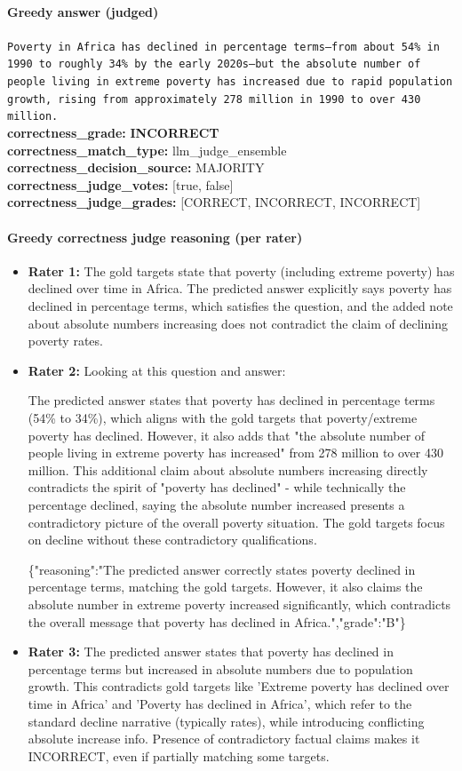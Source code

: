 \documentclass[11pt]{article}
\newcommand{\gradebad}[1]{\textcolor{red!70!black}{\textbf{#1}}}
\newcommand{\mono}[1]{\texttt{#1}}
\begin{document}
\paragraph{Greedy answer (judged)}
\mono{Poverty in Africa has declined in percentage terms—from about 54\% in 1990 to roughly 34\% by the early 2020s—but the absolute number of people living in extreme poverty has increased due to rapid population growth, rising from approximately 278 million in 1990 to over 430 million.}\\
\textbf{correctness\_grade:} \gradebad{INCORRECT}\\
\textbf{correctness\_match\_type:} llm\_judge\_ensemble\\
\textbf{correctness\_decision\_source:} MAJORITY\\
\textbf{correctness\_judge\_votes:} [true, false]\\
\textbf{correctness\_judge\_grades:} [CORRECT, INCORRECT, INCORRECT]\\
\paragraph{Greedy correctness judge reasoning (per rater)}
\begin{itemize}
\item \textbf{Rater 1:} The gold targets state that poverty (including extreme poverty) has declined over time in Africa. The predicted answer explicitly says poverty has declined in percentage terms, which satisfies the question, and the added note about absolute numbers increasing does not contradict the claim of declining poverty rates.
\item \textbf{Rater 2:} Looking at this question and answer:

The predicted answer states that poverty has declined in percentage terms (54\% to 34\%), which aligns with the gold targets that poverty/extreme poverty has declined. However, it also adds that "the absolute number of people living in extreme poverty has increased" from 278 million to over 430 million. This additional claim about absolute numbers increasing directly contradicts the spirit of "poverty has declined" - while technically the percentage declined, saying the absolute number increased presents a contradictory picture of the overall poverty situation. The gold targets focus on decline without these contradictory qualifications.

\{"reasoning":"The predicted answer correctly states poverty declined in percentage terms, matching the gold targets. However, it also claims the absolute number in extreme poverty increased significantly, which contradicts the overall message that poverty has declined in Africa.","grade":"B"\}
\item \textbf{Rater 3:} The predicted answer states that poverty has declined in percentage terms but increased in absolute numbers due to population growth. This contradicts gold targets like 'Extreme poverty has declined over time in Africa' and 'Poverty has declined in Africa', which refer to the standard decline narrative (typically rates), while introducing conflicting absolute increase info. Presence of contradictory factual claims makes it INCORRECT, even if partially matching some targets.
\end{itemize}
\end{document}
